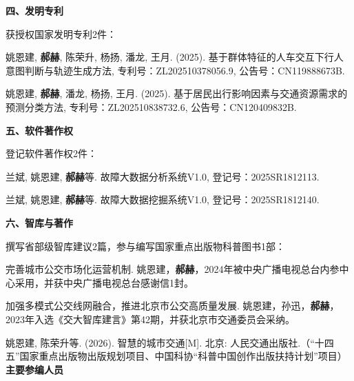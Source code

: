 \vspace{10pt}
\textbf{四、发明专利}
\vspace{5pt}

获授权国家发明专利2件：

\begin{enumerate}[leftmargin=*, parsep=5pt, label={[\arabic*]}]

	\item 姚恩建, \textbf{郝赫}, 陈荣升, 杨扬, 潘龙, 王月. (2025). 基于群体特征的人车交互下行人意图判断与轨迹生成方法, 专利号：ZL202510378056.9, 公告号：CN119888673B.

	\item 姚恩建, \textbf{郝赫}, 潘龙, 杨扬, 王月. (2025). 基于居民出行影响因素与交通资源需求的预测分类方法, 专利号：ZL202510838732.6, 公告号：CN120409832B.

\end{enumerate}

\vspace{10pt}
\textbf{五、软件著作权}
\vspace{5pt}

登记软件著作权2件：

\begin{enumerate}[leftmargin=*, parsep=5pt, label={[\arabic*]}]

	\item 兰斌, 姚恩建, \textbf{郝赫}等. 故障大数据分析系统V1.0, 登记号：2025SR1812113.

	\item 兰斌, 姚恩建, \textbf{郝赫}等. 故障大数据挖掘系统V1.0, 登记号：2025SR1812140.

\end{enumerate}

\vspace{10pt}
\textbf{六、智库与著作}
\vspace{5pt}

撰写省部级智库建议2篇，参与编写国家重点出版物科普图书1部：

\begin{enumerate}[leftmargin=*, parsep=5pt, label={[\arabic*]}]

	\item 完善城市公交市场化运营机制. 姚恩建，\textbf{郝赫}，2024年被中央广播电视总台内参中心采用，并获中央广播电视总台感谢信1封。

	\item 加强多模式公交线网融合，推进北京市公交高质量发展. 姚恩建，孙迅，\textbf{郝赫}，2023年入选《交大智库建言》第42期，并获北京市交通委员会采纳。

	\item 姚恩建, 陈荣升等. (2026). 智慧的城市交通[M]. 北京: 人民交通出版社.（``十四五''国家重点出版物出版规划项目、中国科协``科普中国创作出版扶持计划''项目）\textbf{主要参编人员}

\end{enumerate}

